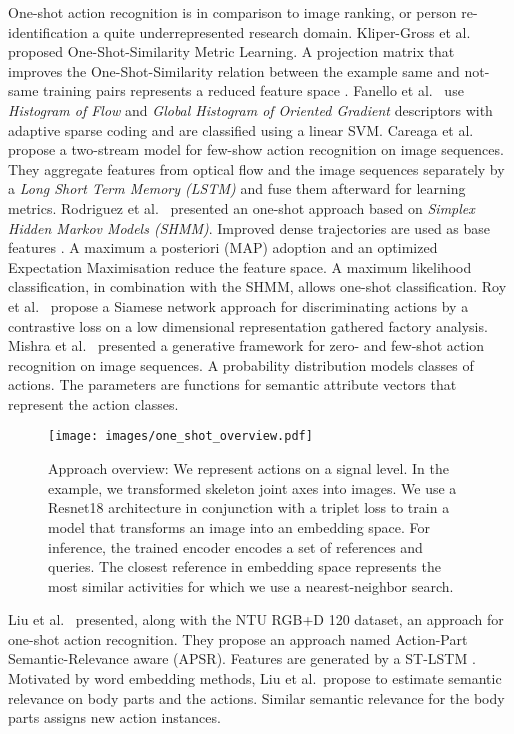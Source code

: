 \documentclass[10pt,conference,a4paper]{IEEEtran}
\def\andothers{et al.\ }
\begin{document}
One-shot action recognition is in comparison to image ranking, or person re-identification a quite underrepresented research domain.
Kliper-Gross \andothers \cite{kliper2011one} proposed One-Shot-Similarity Metric Learning. A projection matrix that improves the One-Shot-Similarity relation between the example same and not-same training pairs represents a reduced feature space \cite{kliper2011one}. 
Fanello \andothers \cite{fanello2013one} use \textit{Histogram of Flow} and \textit{Global Histogram of Oriented Gradient} descriptors with adaptive sparse coding and are classified using a linear SVM.
Careaga \andothers \cite{careaga2019metric} propose a two-stream model for few-show action recognition on image sequences. They aggregate features from optical flow and the image sequences separately by a \textit{Long Short Term Memory (LSTM)} and fuse them afterward for learning metrics.
Rodriguez \andothers \cite{rodriguez2017fast} presented an one-shot approach based on \textit{Simplex Hidden Markov Models (SHMM)}. Improved dense trajectories are used as base features \cite{wang2013action}. A maximum a posteriori (MAP) adoption and an optimized Expectation Maximisation reduce the feature space. A maximum likelihood classification, in combination with the SHMM, allows one-shot classification.
Roy \andothers \cite{roy2018action} propose a Siamese network approach for discriminating actions by a contrastive loss on a low dimensional representation gathered factory analysis.
Mishra \andothers \cite{mishra2018generative} presented a generative framework for zero- and few-shot action recognition on image sequences. A probability distribution models classes of actions. The parameters are functions for semantic attribute vectors that represent the action classes. 

\begin{figure*}[ht]
    \centering
    \texttt{[image: images/one\_shot\_overview.pdf]}
    \caption{Approach overview: We represent actions on a signal level. In the example, we transformed skeleton joint axes into images. We use a Resnet18 architecture in conjunction with a triplet loss to train a model that transforms an image into an embedding space. For inference, the trained encoder encodes a set of references and queries. The closest reference in embedding space  represents the most similar activities for which we use a nearest-neighbor search.}
    \label{fig:approach}
\end{figure*}

Liu \andothers \cite{liu2019ntu} presented, along with the NTU RGB+D 120 dataset, an approach for one-shot action recognition. They propose an approach named Action-Part Semantic-Relevance aware (APSR). Features are generated by a ST-LSTM \cite{liu2017skeletonlstm}. Motivated by word embedding methods, Liu \andothers propose to estimate semantic relevance on body parts and the actions. Similar semantic relevance for the body parts assigns new action instances.
\end{document}
